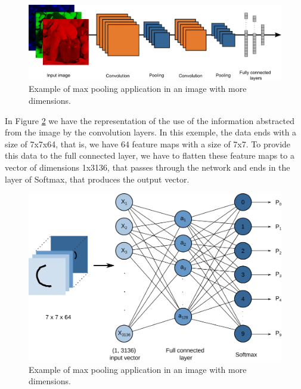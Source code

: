 \begin{figure}
    \centering
    \includegraphics[scale=0.22]{"Part 3 - Learning Systems/Supervised Learning/Deep Learning/images/figure123.png"}
    \caption{Example of max pooling application in an image with more dimensions.}
    \label{fig:figure123}
\end{figure}

In Figure \ref{fig:figure124} we have the representation of the use of the information abstracted from the image by the convolution layers. In this exemple, the data ends with a size of 7x7x64, that is, we have 64 feature maps with a size of 7x7. To provide this data to the full connected layer, we have to flatten these feature maps to a vector of dimensions 1x3136, that passes through the network and ends in the layer of Softmax, that produces the output vector.

\begin{figure}
    \centering
    \includegraphics[scale=0.50]{"Part 3 - Learning Systems/Supervised Learning/Deep Learning/images/figure124.png"}
    \caption{Example of max pooling application in an image with more dimensions.}
    \label{fig:figure124}
\end{figure}

